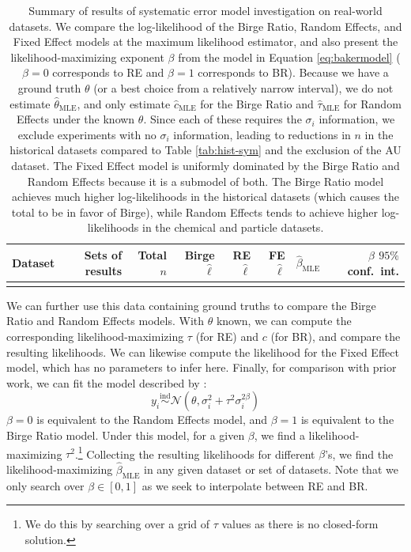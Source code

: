 \documentclass[letterpaper,12pt]{article}
\begin{document}
\begin{table}[htbp]
\centering
\caption{Summary of results of systematic error model investigation on real-world datasets. We compare the log-likelihood of the Birge Ratio, Random Effects, and Fixed Effect models at the maximum likelihood estimator, and also present the likelihood-maximizing exponent $\beta$ from the model in Equation \ref{eq:bakermodel} ($\beta=0$ corresponds to RE and $\beta=1$ corresponds to BR). Because we have a ground truth $\theta$ (or a best choice from a relatively narrow interval), we do not estimate $\hat\theta_{\mathrm{MLE}}$, and only estimate $\hat{c}_{\mathrm{MLE}}$ for the Birge Ratio and $\hat{\tau}_{\mathrm{MLE}}$ for Random Effects under the known $\theta$. Since each of these requires the $\sigma_i$ information, we exclude experiments with no $\sigma_i$ information, leading to reductions in $n$ in the historical datasets compared to Table \ref{tab:hist-sym} and the exclusion of the AU dataset. The Fixed Effect model is uniformly dominated by the Birge Ratio and Random Effects because it is a submodel of both. The Birge Ratio model achieves much higher log-likelihoods in the historical datasets (which causes the total to be in favor of Birge), while Random Effects tends to achieve higher log-likelihoods in the chemical and particle datasets.}
\label{tab:hist-syst}
\smaller
\begin{tabular}{lrrrrrrr}
  \hline Dataset & Sets of results & Total $n$ & Birge $\hat\ell$ & RE $\hat\ell$ & FE $\hat\ell$ & $\hat\beta_{\mathrm{MLE}}$ & $\beta$ $95\%$ conf.~int.  \\\hline\hline
  \\\hline
  \end{tabular}
\end{table}

We can further use this data containing ground truths to compare the Birge Ratio and Random Effects models. With $\theta$ known, we can compute the corresponding likelihood-maximizing $\tau$ (for RE) and $c$ (for BR), and compare the resulting likelihoods. We can likewise compute the likelihood for the Fixed Effect model, which has no parameters to infer here. Finally, for comparison with prior work, we can fit the model described by \citet[eq.~4]{baker2013meta}:
\begin{equation}\label{eq:bakermodel}
  y_i\overset{\mathrm{ind}}\sim\mathcal{N}(\theta,\sigma_i^2+\tau^2\sigma_i^{2\beta})
\end{equation}
$\beta=0$ is equivalent to the Random Effects model, and $\beta=1$ is equivalent to the Birge Ratio model. Under this model, for a given $\beta$, we find a likelihood-maximizing $\tau^2$.\footnote{
We do this by searching over a grid of $\tau$ values as there is no closed-form solution. %
}
Collecting the resulting likelihoods for different $\beta$'s, we find the likelihood-maximizing $\hat\beta_{\mathrm{MLE}}$ in any given dataset or set of datasets. Note that we only search over $\beta\in[0,1]$ as we seek to interpolate between RE and BR.
\end{document}
